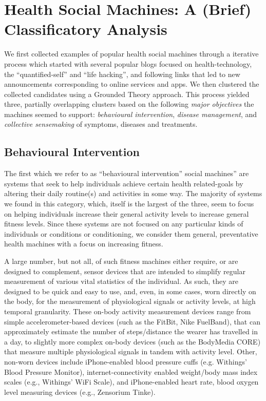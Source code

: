 \documentclass{sig-alternate}
\begin{document}
\section{Health Social Machines: A (Brief) Classificatory Analysis}

We first collected examples of popular health social machines through
a iterative process which started with several popular blogs focused
on health-technology, the ``quantified-self'' and ``life hacking'',
and following links that led to new announcements corresponding to
online services and apps.  We then clustered the collected candidates
using a Grounded Theory approach.  This process yielded three,
partially overlapping clusters based on the following \emph{major
  objectives} the machines seemed to support: \emph{behavioural
  intervention}, \emph{disease management}, and \emph{collective
  sensemaking} of symptoms, diseases and treatments. 

\subsection{Behavioural Intervention}

The first which we refer to as ``behavioural intervention'' social
machines'' are systems that seek to help individuals achieve certain
health related-goals by altering their daily routine(s) and activities
in some way.  The majority of systems we found in this category,
which, itself is the largest of the three, seem to focus on helping
individuals increase their general activity levels to increase general
fitness levels.  Since these systems are not focused on any particular
kinds of individuals or conditions or conditioning, we consider them
general, preventative health machines with a focus on increasing
fitness.

A large number, but not all, of such fitness machines either require,
or are designed to complement, sensor devices that are intended to
simplify regular measurement of various vital statistics of the
individual.  As such, they are designed to be quick and easy to use,
and, even, in some cases, worn directly on the body, for the measurement
of physiological signals or activity levels, at high temporal
granularity. These on-body activity measurement devices range from
simple accelerometer-based devices (such as the FitBit, Nike
FuelBand), that can approximately estimate the number of
steps/distance the wearer has travelled in a day, to slightly more
complex on-body devices (such as the BodyMedia CORE) that measure
multiple physiological signals in tandem with activity level.  Other,
non-worn devices include iPhone-enabled blood pressure cuffs (e.g.
Withings' Blood Pressure Monitor), internet-connectivity enabled
weight/body mass index scales (e.g., Withings' WiFi Scale), and
iPhone-enabled heart rate, blood oxygen level measuring devices (e.g.,
Zensorium Tinke).  
\end{document}
